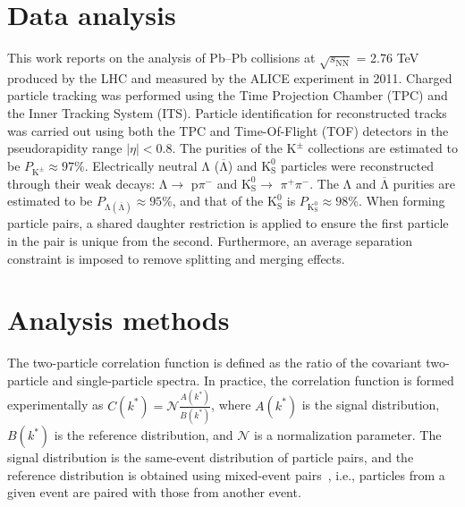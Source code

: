 \documentclass{svproc}
\newcommand{\Lam}{$\mathrm{\Lambda}$\xspace}
\newcommand{\ALam}{$\overline{\mathrm{\Lambda}}$\xspace}
\newcommand{\LamALam}{$\mathrm{\Lambda}$ ($\overline{\mathrm{\Lambda}}$)\xspace}
\newcommand{\Kpm}{$\mathrm{K^{\pm}}$\xspace}
\newcommand{\Ks}{$\mathrm{K^{0}_{S}}$\xspace}
\begin{document}
\section{Data analysis}
\label{sec:DataAnalysis}

This work reports on the analysis of Pb--Pb collisions at $\sqrt{s_{\mathrm{NN}}}$ = 2.76 TeV produced by the LHC and measured by the ALICE experiment in 2011.
Charged particle tracking was performed using the Time Projection Chamber (TPC) and the Inner Tracking System (ITS).  
Particle identification for reconstructed tracks was carried out using both the TPC and Time-Of-Flight (TOF) detectors in the pseudorapidity range $|\eta| < 0.8$.  
The purities of the \Kpm collections are estimated to be $P_{\mathrm{K}^{\pm}} \approx 97\%$.
Electrically neutral \LamALam and \Ks particles were reconstructed through their weak decays: \Lam $\rightarrow$ p$\pi^{-}$ and \Ks $\rightarrow$ $\pi^{+}\pi^{-}$.
The \Lam and \ALam purities are estimated to be $P_{\mathrm{\Lambda}(\overline{\mathrm{\Lambda}})} \approx 95\%$, and that of the \Ks is $P_{\mathrm{K^{0}_{S}}} \approx 98\%$.
When forming particle pairs, a shared daughter restriction is applied to ensure the first particle in the pair is unique from the second. 
Furthermore, an average separation constraint is imposed to remove splitting and merging effects.


\section{Analysis methods}
\label{sec:AnalysisMethods}
The two-particle correlation function is defined as the ratio of the covariant two-particle and single-particle spectra.
In practice, the correlation function is formed experimentally as $C(k^{*}) = \mathcal{N}\frac{A(k^{*})}{B(k^{*})}$, where $A(k^{*})$ is the signal distribution, $B(k^{*})$ is the reference distribution, and $\mathcal{N}$ is a normalization parameter. 
The signal distribution is the same-event distribution of particle pairs, and the reference distribution is obtained using mixed-event pairs~\cite{Kopylov:1974th}, i.e., particles from a given event are paired with those from another event.
\end{document}
